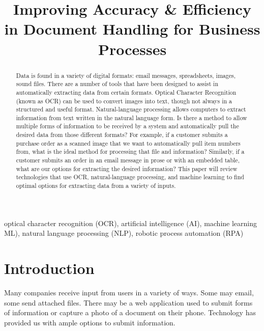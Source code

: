 \documentclass[conference]{IEEEtran}
\begin{document}
\title{Improving Accuracy \& Efficiency in Document Handling for Business Processes}

\author{
}

\maketitle

\begin{abstract}
Data is found in a variety of digital formats: email messages, spreadsheets, images, sound files. There are a number of tools that have been designed to assist in automatically extracting data from certain formats. Optical Character Recognition (known as OCR) can be used to convert images into text, though not always in a structured and useful format. Natural-language processing allows computers to extract information from text written in the natural language form. Is there a method to allow multiple forms of information to be received by a system and automatically pull the desired data from those different formats? For example, if a customer submits a purchase order as a scanned image that we want to automatically pull item numbers from, what is the ideal method for processing that file and information? Similarly, if a customer submits an order in an email message in prose or with an embedded table, what are our options for extracting the desired information? This paper will review technologies that use OCR, natural-language processing, and machine learning to find optimal options for extracting data from a variety of inputs.
\end{abstract}

\begin{IEEEkeywords}
optical character recognition (OCR), artificial intelligence (AI), machine learning ML), natural language processing (NLP), robotic process automation (RPA)
\end{IEEEkeywords}

\section{Introduction}
Many companies receive input from users in a variety of ways. Some may email, some send attached files. There may be a web application used to submit forms of information or capture a photo of a document on their phone. Technology has provided us with ample options to submit information.
\end{document}
